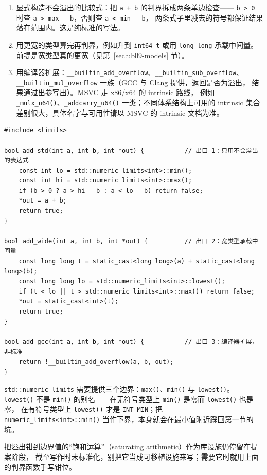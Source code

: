 \documentclass[12pt,a4paper,fontset=fandol]{ctexbook}
\newcommand{\Fn}[1]{\texttt{#1()}}
\newcommand{\Tp}[1]{\texttt{#1}}
\newcommand{\Bk}{\discretionary{}{}{}}
\begin{document}
\begin{enumerate}
  \item 显式构造不会溢出的比较式：把 \Tp{a + b} 的判界拆成两条单边检查——
        \Tp{b > 0} 时查 \Tp{a > max - b}，否则查 \Tp{a < min - b}，
        两条式子里减去的符号都保证结果落在范围内。这是纯标准的写法。
  \item 用更宽的类型算完再判界，例如升到 \Tp{int64\_t} 或用 \Tp{long long}
        承载中间量。前提是宽类型真的更宽（见第~\ref{sec:ub09-models} 节）。
  \item 用编译器扩展：\Tp{\_\_builtin{\Bk}\_add{\Bk}\_overflow}、\Tp{\_\_builtin{\Bk}\_sub{\Bk}\_overflow}、
        \Tp{\_\_builtin{\Bk}\_mul{\Bk}\_overflow} 一族（GCC 与 Clang 提供，返回是否为溢出，
        结果通过出参写出）。MSVC 走 x86/x64 的 intrinsic 路线，
        例如 \Fn{\_mulx\_u64}、\Fn{\_addcarry\_u64} 一类；不同体系结构上可用的
        intrinsic 集合差别很大，具体名字与可用性请以 MSVC 的 intrinsic 文档为准。
\end{enumerate}

\begin{lstlisting}[style=cppstyle, caption={三条出口：标准判界、宽类型、编译器扩展}]
#include <limits>

bool add_std(int a, int b, int *out) {           // 出口 1：只用不会溢出的表达式
    const int lo = std::numeric_limits<int>::min();
    const int hi = std::numeric_limits<int>::max();
    if (b > 0 ? a > hi - b : a < lo - b) return false;
    *out = a + b;
    return true;
}

bool add_wide(int a, int b, int *out) {          // 出口 2：宽类型承载中间量
    const long long t = static_cast<long long>(a) + static_cast<long long>(b);
    const long long lo = std::numeric_limits<int>::lowest();
    if (t < lo || t > std::numeric_limits<int>::max()) return false;
    *out = static_cast<int>(t);
    return true;
}

bool add_gcc(int a, int b, int *out) {           // 出口 3：编译器扩展，非标准
    return !__builtin_add_overflow(a, b, out);
}
\end{lstlisting}

\Tp{std::numeric{\Bk}\_limits} 需要提供三个边界：\Fn{max}、\Fn{min} 与 \Fn{lowest}。
\Fn{lowest} 不是 \Fn{min} 的别名——在无符号类型上 \Fn{min} 是零而 \Fn{lowest} 也是零，
在有符号类型上 \Fn{lowest} 才是 \Tp{INT\_MIN}；把 \Tp{-numeric{\Bk}\_limits<int>::min()}
当作下界，本身就会在最小值附近踩回第一节的坑。

\begin{note}[title={饱和算术尚未标准化}]
把溢出钳到边界值的“饱和运算”（saturating arithmetic）作为库设施仍停留在提案阶段，
截至写作时未标准化，别把它当成可移植设施来写；需要它时就用上面的判界函数手写钳位。
\end{note}
\end{document}
